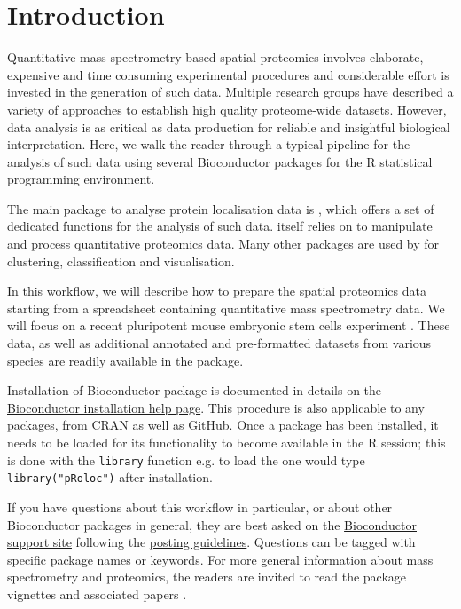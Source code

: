 


\section*{Introduction}

Quantitative mass spectrometry based spatial proteomics involves
elaborate, expensive and time consuming experimental procedures and
considerable effort is invested in the generation of such data.
Multiple research groups have described a variety of approaches to
establish high quality proteome-wide datasets. However, data analysis
is as critical as data production for reliable and insightful
biological interpretation. Here, we walk the reader through a typical
pipeline for the analysis of such data using several Bioconductor
packages for the R statistical programming environment.

The main package to analyse protein localisation data is
, which offers a set of dedicated functions for the
analysis of such data.  itself relies on
 to manipulate and process quantitative
proteomics data. Many other packages are used by 
for clustering, classification and visualisation.

In this workflow, we will describe how to prepare the spatial
proteomics data starting from a spreadsheet containing quantitative
mass spectrometry data. We will focus on a recent pluripotent mouse
embryonic stem cells experiment \cite{hyper}. These data, as well as
additional annotated and pre-formatted datasets from various species
are readily available in the  package.

Installation of Bioconductor package is documented in details on the
\href{http://bioconductor.org/install/#install-bioconductor-packages}{Bioconductor
  installation help page}. This procedure is also applicable to any
packages, from \href{https://cran.r-project.org/}{CRAN} as well as
GitHub. Once a package has been installed, it needs to be loaded for
its functionality to become available in the R session; this is done
with the \texttt{library} function e.g.  to load the
 one would type \texttt{library("pRoloc")}
after installation.

If you have questions about this workflow in particular, or about
other Bioconductor packages in general, they are best asked on the
\href{https://support.bioconductor.org/}{Bioconductor support site}
following the
\href{http://www.bioconductor.org/help/support/posting-guide/}{posting
  guidelines}. Questions can be tagged with specific package names or
keywords. For more general information about mass spectrometry and
proteomics, the readers are invited to read the
 package vignettes and associated
papers \cite{Gatto:2014,Gatto:2015}.


